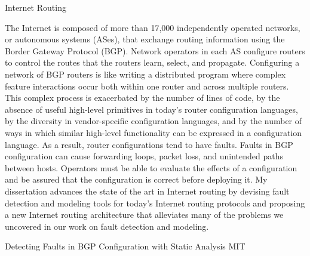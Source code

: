 \documentclass{article}
\begin{document}
\begin{cv}{}
\newpage
\parindent=0pt
\parskip=10pt
{\large\df Internet Routing}

    The Internet is composed of more than 17,000 independently operated
    networks, or autonomous systems (ASes), that exchange routing
    information using the Border Gateway Protocol (BGP).  Network
    operators in each AS configure routers to control the routes that
    the routers learn, select, and propagate.  Configuring a network of
    BGP routers is like writing a distributed program where complex
    feature interactions occur both within one router and across
    multiple routers.  This complex process is exacerbated by the number
    of lines of code, by the absence of useful high-level primitives in
    today's router configuration languages, by the diversity in
    vendor-specific configuration languages, and by the number of ways
    in which similar high-level functionality can be expressed in a
    configuration language.  As a result, router configurations tend to
    have faults.  Faults in BGP configuration can cause forwarding
    loops, packet loss, and unintended paths between hosts.  Operators
    must be able to evaluate the effects of a configuration and be
    assured that the configuration is correct before deploying it.  My
    dissertation advances the state of the art in Internet routing by
    devising fault detection and modeling tools for today's Internet
    routing protocols and proposing a new Internet routing architecture
    that alleviates many of the problems we uncovered in our work on
    fault detection and modeling.



{\mf Detecting Faults in BGP Configuration with Static Analysis} \hfill MIT
\vspace*{-0.1in}


\end{cv}
\end{document}
